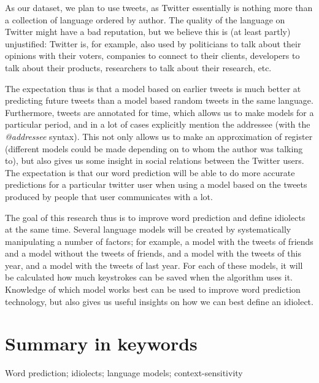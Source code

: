 \documentclass[12pt]{article}
\begin{document}
As our dataset, we plan to use tweets, as Twitter essentially is nothing more than a collection of language ordered by author. The quality of the language on Twitter might have a bad reputation, but we believe this is (at least partly) unjustified: Twitter is, for example, also used by politicians to talk about their opinions with their voters, companies to connect to their clients, developers to talk about their products, researchers to talk about their research, etc. 

The expectation thus is that a model based on earlier tweets is much better at predicting future tweets than a model based random tweets in the same language. Furthermore, tweets are annotated for time, which allows us to make models for a particular period, and in a lot of cases explicitly mention the addressee (with the \emph{@addressee} syntax). This not only allows us to make an approximation of register (different models could be made depending on to whom the author was talking to), but also gives us some insight in social relations between the Twitter users. The expectation is that our word prediction will be able to do more accurate predictions for a particular twitter user when using a model based on the tweets produced by people that user communicates with a lot.

The goal of this research thus is to improve word prediction and define idiolects at the same time. Several language models will be created by systematically manipulating a number of factors; for example, a model with the tweets of friends and a model without the tweets of friends, and a model with the tweets of this year, and a model with the tweets of last year. For each of these models, it will be calculated how much keystrokes can be saved when the algorithm uses it. Knowledge of which model works best can be used to improve word prediction technology, but also gives us useful insights on how we can best define an idiolect.

\section{Summary in keywords}
Word prediction; idiolects; language models; context-sensitivity

{}

\end{document}
